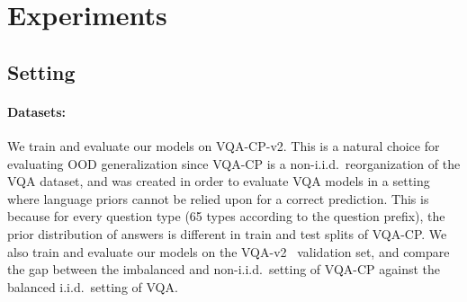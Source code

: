     
    

\section{Experiments}
    \subsection{Setting}
    \paragraph{Datasets:}
    We train and evaluate our models on VQA-CP-v2.
    This is a natural choice for evaluating OOD generalization since VQA-CP is a non-i.i.d.~reorganization of the VQA dataset, and was created in order to evaluate VQA models in a setting where language priors cannot be relied upon for a correct prediction.
    This is because for every question type (65 types according to the question prefix), the prior distribution of answers is different in train and test splits of VQA-CP.
    We also train and evaluate our models on the VQA-v2~\citep{goyal2017making} validation set, and compare the gap between the imbalanced and non-i.i.d.~setting of VQA-CP against the balanced i.i.d.~setting of VQA.
    
